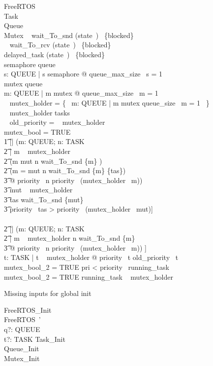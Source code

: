 \begin{schema}{FreeRTOS}
\zstate\\
    Task\\
    Queue\\
    Mutex
\where
    \dom~ wait\_To\_snd \subseteq (state~\inv)~ \limg \{blocked\} \rimg\\
    \dom~ wait\_To\_rcv \subseteq (state~\inv)~ \limg \{blocked\} \rimg\\
    delayed\_task \subseteq (state~\inv)~ \limg \{blocked\} \rimg\\
    semaphore \subseteq queue\\
    \forall s: QUEUE | s \in semaphore @ queue\_max\_size~ s = 1\\
    mutex \subseteq queue\\
    \forall m: QUEUE | m \in mutex @ queue\_max\_size~ m = 1\\
    \dom~ mutex\_holder = \{~ m: QUEUE | m \in mutex \land queue\_size~ m = 1 ~\}\\
    \ran~ mutex\_holder \subseteq tasks\\
    \dom~ old\_priority = \ran~ mutex\_holder\\
    \IF mutex\_bool = TRUE \THEN \\
    \t1  [| (\forall m: QUEUE; n: TASK\\
    \t2     | m \in \dom~ mutex\_holder\\
    \t2     \land (m \neq mut \implies n \in wait\_To\_snd \inv \limg \{m\} \rimg)\\
    \t2     \land (m = mut \implies n \in wait\_To\_snd \inv \limg \{m\} \rimg \setminus \{tas\})\\
    \t3         @ priority~ n \leq priority~ (mutex\_holder~ m)) \\
    \t3     \land mut \in \dom~ mutex\_holder\\
    \t3     \land tas \in wait\_To\_snd \inv \limg \{mut\} \rimg\\
    \t3     \land priority~ tas > priority~ (mutex\_holder~ mut)] \\
    \ELSE \\
    \t2   [| (\forall m: QUEUE; n: TASK\\
    \t2     | m \in \dom~ mutex\_holder \land n \in wait\_To\_snd \inv \limg \{m\} \rimg\\
    \t3         @ priority~ n \leq priority~ (mutex\_holder~ m)) ]\\
    \forall t: TASK | t \in \ran~ mutex\_holder @ priority~ t \geq old\_priority~ t\\
    mutex\_bool\_2 = TRUE \implies pri < priority~ running\_task\\
    mutex\_bool\_2 = TRUE \implies running\_task \notin \ran~ mutex\_holder
\end{schema}

Missing inputs for global init
\begin{schema}{FreeRTOS\_Init}
\zstinit\\
	FreeRTOS~' \\
	q?: QUEUE \\
	t?: TASK
\where
    Task\_Init \\
    Queue\_Init \\
    Mutex\_Init
\end{schema}
